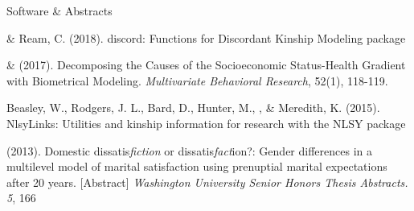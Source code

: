 \begin{rSection}{\textrm{Software \& Abstracts}}%
\begin{etaremune}
\item\meb \& Ream, C.  (2018). discord: Functions for Discordant Kinship Modeling \R package \href{https://CRAN.R-project.org/package=discord}{\color{blue}{https://CRAN.R-project.org/package=discord}}
\item\meb \& \joe (2017). Decomposing the Causes of the Socioeconomic Status-Health Gradient with Biometrical Modeling. \textit{Multivariate Behavioral Research}, 52(1), 118-119. \href{https://osf.io/xbkja/}{\color{blue}{https://osf.io/xbkja/}}
\item  Beasley, W., Rodgers, J. L., Bard, D., Hunter, M., \meb, \& Meredith, K. (2015). NlsyLinks: Utilities and kinship information for research with the NLSY \R package \href{https://cran.r-project.org/web/packages/NlsyLinks}{\color{blue}{https://cran.r-project.org/web/packages/NlsyLinks}}
\item\meb (2013). Domestic dissatis{\em fiction} or dissatis{\em fact}ion?: Gender differences in a multilevel model of marital satisfaction using prenuptial marital expectations after 20 years. [Abstract] {\em Washington University Senior Honors Thesis Abstracts. 5}, 166
\end{etaremune}
\end{rSection}